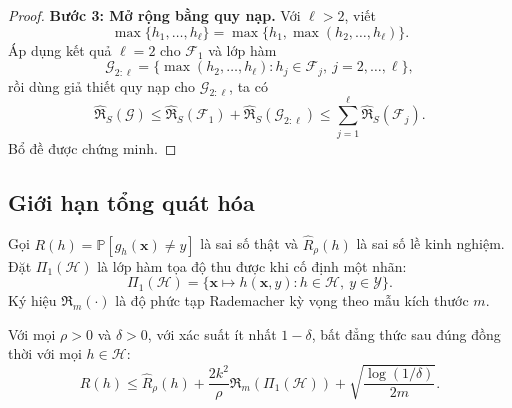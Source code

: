 \begin{proof}
\textbf{Bước 3: Mở rộng bằng quy nạp.}
Với $\ell>2$, viết
\[
  \max\{h_1,\ldots,h_\ell\}
  =\max\{h_1,\max(h_2,\ldots,h_\ell)\}.
\]
Áp dụng kết quả $\ell=2$ cho $\mathcal{F}_1$ và lớp hàm
\[
  \mathcal{G}_{2:\ell}=\{\max(h_2,\ldots,h_\ell):h_j\in\mathcal{F}_j,\ j=2,\ldots,\ell\},
\]
rồi dùng giả thiết quy nạp cho $\mathcal{G}_{2:\ell}$, ta có
\[
  \widehat{\mathfrak{R}}_S(\mathcal{G})
  \leq \widehat{\mathfrak{R}}_S(\mathcal{F}_1)
  +\widehat{\mathfrak{R}}_S(\mathcal{G}_{2:\ell})
  \leq \sum_{j=1}^{\ell}\widehat{\mathfrak{R}}_S(\mathcal{F}_j).
\]
Bổ đề được chứng minh.
\end{proof}

\subsection{Giới hạn tổng quát hóa}

Gọi $R(h)=\mathbb{P}[g_h(\bm{x})\neq y]$ là sai số thật và $\widehat{R}_\rho(h)$ là sai số lề kinh nghiệm. Đặt $\Pi_1(\mathcal{H})$ là lớp hàm tọa độ thu được khi cố định một nhãn:
\[
  \Pi_1(\mathcal{H})=\{\bm{x}\mapsto h(\bm{x},y):h\in\mathcal{H},\ y\in\mathcal{Y}\}.
\]
Ký hiệu $\mathfrak{R}_m(\cdot)$ là độ phức tạp Rademacher kỳ vọng theo mẫu kích thước $m$.

\begin{theorem}
Với mọi $\rho>0$ và $\delta>0$, với xác suất ít nhất $1-\delta$, bất đẳng thức sau đúng đồng thời với mọi $h\in\mathcal{H}$:
\[
  R(h)\leq \widehat{R}_{\rho}(h)
  +\frac{2k^2}{\rho}\mathfrak{R}_m(\Pi_1(\mathcal{H}))
  +\sqrt{\frac{\log(1/\delta)}{2m}}.
\]
\end{theorem}

